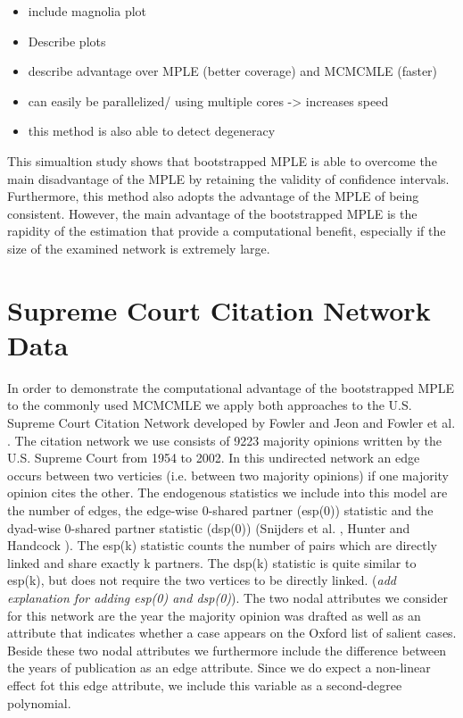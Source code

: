 \documentclass[headsepline=true, abstracton]{scrartcl}
\begin{document}
\begin{itemize}

\item include magnolia plot
\item Describe plots
\item describe advantage over MPLE (better coverage) and MCMCMLE (faster)
\item can easily be parallelized/ using multiple cores -> increases speed
\item this method is also able to detect degeneracy

\end{itemize}

\noindent This simualtion study shows that bootstrapped MPLE is able to overcome the main disadvantage of the MPLE by retaining the validity of confidence intervals. Furthermore, this method also adopts the advantage of the MPLE of being consistent. However, the main advantage of the bootstrapped MPLE is the rapidity of the estimation that provide a computational benefit, especially if the size of the examined network is extremely large.

\section*{Supreme Court Citation Network Data}

In order to demonstrate the computational advantage of the bootstrapped MPLE to the commonly used MCMCMLE we apply both approaches to the U.S. Supreme Court Citation Network developed by Fowler and Jeon \cite{FowlerJeon2008} and Fowler et al. \cite{Fowleretal2007}. The citation network we use consists of 9223 majority opinions written by the U.S. Supreme Court from 1954 to 2002. In this undirected network an edge occurs between two verticies (i.e. between two majority opinions) if one majority opinion cites the other. The endogenous statistics we include into this model are the number of edges, the edge-wise 0-shared partner (esp(0)) statistic and the dyad-wise 0-shared partner statistic (dsp(0)) (Snijders et al. \cite{SnijdersTomA.B..2006}, Hunter and Handcock \cite{Hunter.2006}). The esp(k) statistic counts the number of pairs which are directly linked and share exactly k partners. The dsp(k) statistic is quite similar to esp(k), but does not require the two vertices to be directly linked. ({\it add explanation for adding esp(0) and dsp(0)}). 
The two nodal attributes we consider for this network are the year the majority opinion was drafted as well as an attribute that indicates whether a case appears on the Oxford list of salient cases. Beside these two nodal attributes we furthermore include the difference between the years of publication as an edge attribute. Since we do expect a non-linear effect fot this edge attribute, we include this variable as a second-degree polynomial.
 
\end{document}
